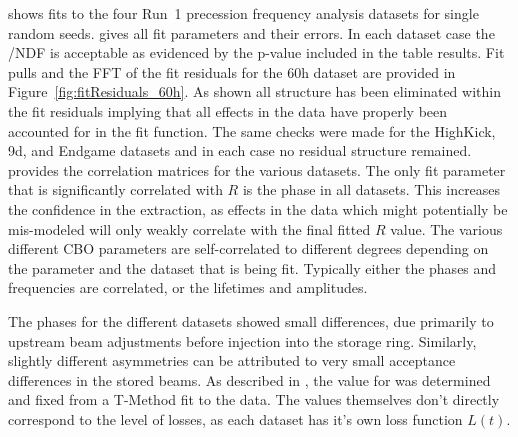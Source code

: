  shows fits to the four Run~1 precession frequency analysis datasets for single random seeds.  gives all fit parameters and their errors. In each dataset case the \chisq/NDF is acceptable as evidenced by the p-value included in the table results. Fit pulls and the FFT of the fit residuals for the 60h dataset are provided in Figure~\ref{fig:fitResiduals_60h}. As shown all structure has been eliminated within the fit residuals implying that all effects in the data have properly been accounted for in the fit function. The same checks were made for the HighKick, 9d, and Endgame datasets and in each case no residual structure remained.  provides the correlation matrices for the various datasets. The only fit parameter that is significantly correlated with $R$ is the \gmtwo phase in all datasets. This increases the confidence in the \wa extraction, as effects in the data which might potentially be mis-modeled will only weakly correlate with the final fitted $R$ value. The various different CBO parameters are self-correlated to different degrees depending on the parameter and the dataset that is being fit. Typically either the phases and frequencies are correlated, or the lifetimes and amplitudes. 

The \gmtwo phases for the different datasets showed small differences, due primarily to upstream beam adjustments before injection into the storage ring. Similarly, slightly different asymmetries can be attributed to very small acceptance differences in the stored beams. As described in , the value for \K was determined and fixed from a T-Method fit to the data. The values themselves don't directly correspond to the level of losses, as each dataset has it's own loss function $L(t)$.


